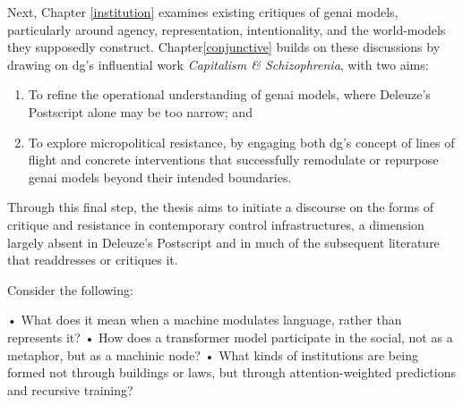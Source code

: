 Next, Chapter \ref{institution} examines existing critiques of \gls{genai} models, particularly around agency, representation, intentionality, and the world-models they supposedly construct. Chapter\ref{conjunctive} builds on these discussions by drawing on \gls{dg}’s influential work \textit{Capitalism \& Schizophrenia}, with two aims:
\begin{enumerate}
	\item To refine the operational understanding of \gls{genai} models, where Deleuze’s Postscript alone may be too narrow; and
	\item To explore micropolitical resistance, by engaging both \gls{dg}’s concept of lines of flight and concrete interventions that successfully remodulate or repurpose \gls{genai} models beyond their intended boundaries.
\end{enumerate}

Through this final step, the thesis aims to initiate a discourse on the forms of critique and resistance in contemporary control infrastructures, a dimension largely absent in Deleuze’s Postscript and in much of the subsequent literature that readdresses or critiques it.

\begin{orangebox}
	Consider the following:


	•	What does it mean when a machine modulates language, rather than represents it?
	•	How does a transformer model participate in the social, not as a metaphor, but as a machinic node?
	•	What kinds of institutions are being formed not through buildings or laws, but through attention-weighted predictions and recursive training?
\end{orangebox}


